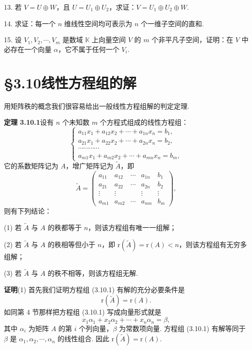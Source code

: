 \documentclass[UTF8,12pt,a4paper,fontset=fandol]{ctexart}
\begin{document}
13. 若 $V=U\oplus W$，且 $U=U_1\oplus U_2$，求证：$V=U_1\oplus U_2\oplus W$.

14. 求证：每一个 $n$ 维线性空间均可表示为 $n$ 个一维子空间的直和.

15. 设 $V_1,V_2,\cdots,V_m$ 是数域 $\mathbb{K}$ 上向量空间 $V$ 的 $m$ 个非平凡子空间，证明：在 $V$ 中必存在一个向量 $\alpha$，它不属于任何一个 $V_i$.

\section*{§3.10\quad 线性方程组的解}

用矩阵秩的概念我们很容易给出一般线性方程组解的判定定理.

\noindent\textbf{定理 3.10.1}\quad 设有 $n$ 个未知数 $m$ 个方程式组成的线性方程组：
\begin{equation}
\left\{\begin{array}{c}
a_{11}x_1+a_{12}x_2+\cdots+a_{1n}x_n=b_1,\\
a_{21}x_1+a_{22}x_2+\cdots+a_{2n}x_n=b_2,\\
\cdots\cdots\cdots\cdots\\
a_{m1}x_1+a_{m2}x_2+\cdots+a_{mn}x_n=b_m,
\end{array}\right.
\tag{3.10.1}
\end{equation}
它的系数矩阵记为 $A$，增广矩阵记为 $\widetilde{A}$，即
\[
\widetilde{A}=\left(\begin{array}{ccccc}
a_{11}&a_{12}&\cdots&a_{1n}&b_1\\
a_{21}&a_{22}&\cdots&a_{2n}&b_2\\
\vdots&\vdots&&\vdots&\vdots\\
a_{m1}&a_{m2}&\cdots&a_{mn}&b_m
\end{array}\right),
\]
则有下列结论：

(1) 若 $\widetilde{A}$ 与 $A$ 的秩都等于 $n$，则该方程组有唯一一组解；

(2) 若 $\widetilde{A}$ 与 $A$ 的秩相等但小于 $n$，即 $\mathrm{r}(\widetilde{A})=\mathrm{r}(A)<n$，则该方程组有无穷多组解；

(3) 若 $\widetilde{A}$ 与 $A$ 的秩不相等，则该方程组无解.

\noindent\textbf{证明}\quad (1) 首先我们证明方程组 (3.10.1) 有解的充分必要条件是
\[
\mathrm{r}(\widetilde{A})=\mathrm{r}(A).
\]
如同第 4 节那样把方程组 (3.10.1) 写成向量形式就是
\begin{equation}
x_1\alpha_1+x_2\alpha_2+\cdots+x_n\alpha_n=\beta,
\tag{3.10.2}
\end{equation}
其中 $\alpha_i$ 为矩阵 $A$ 的第 $i$ 个列向量，$\beta$ 为常数项向量. 方程组 (3.10.1) 有解等同于 $\beta$ 是 $\alpha_1,\alpha_2,\cdots,\alpha_n$ 的线性组合. 因此 $\mathrm{r}(\widetilde{A})=\mathrm{r}(A)$.
\end{document}
